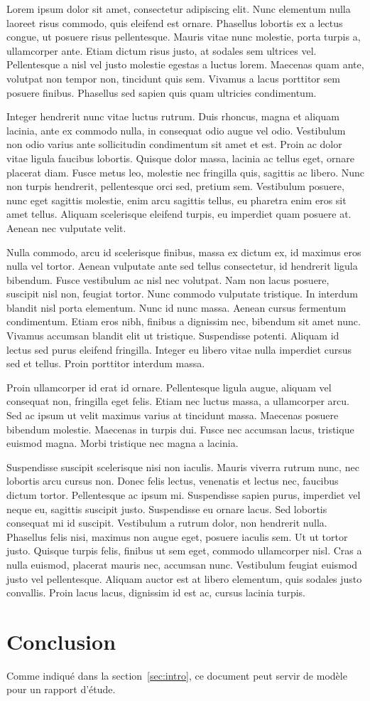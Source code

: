 \documentclass[twoside,openright,a4paper,11pt,french]{article}
\begin{document}
Lorem ipsum dolor sit amet, consectetur adipiscing elit. Nunc elementum nulla laoreet risus commodo, quis eleifend est ornare. Phasellus lobortis ex a lectus congue, ut posuere risus pellentesque. Mauris vitae nunc molestie, porta turpis a, ullamcorper ante. Etiam dictum risus justo, at sodales sem ultrices vel. Pellentesque a nisl vel justo molestie egestas a luctus lorem. Maecenas quam ante, volutpat non tempor non, tincidunt quis sem. Vivamus a lacus porttitor sem posuere finibus. Phasellus sed sapien quis quam ultricies condimentum.

Integer hendrerit nunc vitae luctus rutrum. Duis rhoncus, magna et aliquam lacinia, ante ex commodo nulla, in consequat odio augue vel odio. Vestibulum non odio varius ante sollicitudin condimentum sit amet et est. Proin ac dolor vitae ligula faucibus lobortis. Quisque dolor massa, lacinia ac tellus eget, ornare placerat diam. Fusce metus leo, molestie nec fringilla quis, sagittis ac libero. Nunc non turpis hendrerit, pellentesque orci sed, pretium sem. Vestibulum posuere, nunc eget sagittis molestie, enim arcu sagittis tellus, eu pharetra enim eros sit amet tellus. Aliquam scelerisque eleifend turpis, eu imperdiet quam posuere at. Aenean nec vulputate velit.

Nulla commodo, arcu id scelerisque finibus, massa ex dictum ex, id maximus eros nulla vel tortor. Aenean vulputate ante sed tellus consectetur, id hendrerit ligula bibendum. Fusce vestibulum ac nisl nec volutpat. Nam non lacus posuere, suscipit nisl non, feugiat tortor. Nunc commodo vulputate tristique. In interdum blandit nisl porta elementum. Nunc id nunc massa. Aenean cursus fermentum condimentum. Etiam eros nibh, finibus a dignissim nec, bibendum sit amet nunc. Vivamus accumsan blandit elit ut tristique. Suspendisse potenti. Aliquam id lectus sed purus eleifend fringilla. Integer eu libero vitae nulla imperdiet cursus sed et tellus. Proin porttitor interdum massa.

Proin ullamcorper id erat id ornare. Pellentesque ligula augue, aliquam vel consequat non, fringilla eget felis. Etiam nec luctus massa, a ullamcorper arcu. Sed ac ipsum ut velit maximus varius at tincidunt massa. Maecenas posuere bibendum molestie. Maecenas in turpis dui. Fusce nec accumsan lacus, tristique euismod magna. Morbi tristique nec magna a lacinia.

Suspendisse suscipit scelerisque nisi non iaculis. Mauris viverra rutrum nunc, nec lobortis arcu cursus non. Donec felis lectus, venenatis et lectus nec, faucibus dictum tortor. Pellentesque ac ipsum mi. Suspendisse sapien purus, imperdiet vel neque eu, sagittis suscipit justo. Suspendisse eu ornare lacus. Sed lobortis consequat mi id suscipit. Vestibulum a rutrum dolor, non hendrerit nulla. Phasellus felis nisi, maximus non augue eget, posuere iaculis sem. Ut ut tortor justo. Quisque turpis felis, finibus ut sem eget, commodo ullamcorper nisl. Cras a nulla euismod, placerat mauris nec, accumsan nunc. Vestibulum feugiat euismod justo vel pellentesque. Aliquam auctor est at libero elementum, quis sodales justo convallis. Proin lacus lacus, dignissim id est ac, cursus lacinia turpis.

\section{Conclusion}
\label{sec:ccl}
Comme indiqué dans la section~\ref{sec:intro}, ce document peut servir de modèle pour un rapport d'étude.

\cleardoublepage
{}


\end{document}
